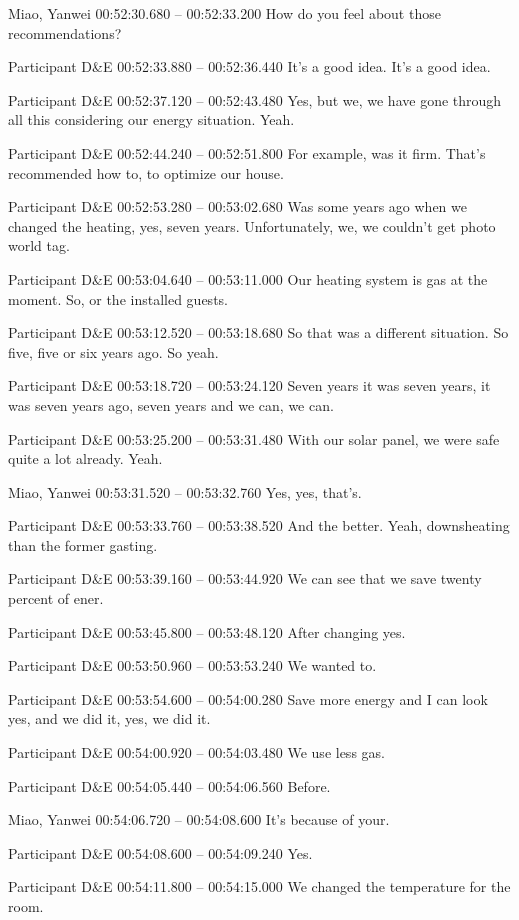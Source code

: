 {Miao, Yanwei 00:52:30.680 -- 00:52:33.200
How do you feel about those recommendations?

Participant D\&E 00:52:33.880 -- 00:52:36.440
It's a good idea. It's a good idea.

Participant D\&E 00:52:37.120 -- 00:52:43.480
Yes, but we, we have gone through all this considering our energy situation. Yeah.

Participant D\&E 00:52:44.240 -- 00:52:51.800
For example, was it firm. That's recommended how to, to optimize our house.

Participant D\&E 00:52:53.280 -- 00:53:02.680
Was some years ago when we changed the heating, yes, seven years. Unfortunately, we, we couldn't get photo world tag.

Participant D\&E 00:53:04.640 -- 00:53:11.000
Our heating system is gas at the moment. So, or the installed guests.

Participant D\&E 00:53:12.520 -- 00:53:18.680
So that was a different situation. So five, five or six years ago. So yeah.

Participant D\&E 00:53:18.720 -- 00:53:24.120
Seven years it was seven years, it was seven years ago, seven years and we can, we can.

Participant D\&E 00:53:25.200 -- 00:53:31.480
With our solar panel, we were safe quite a lot already. Yeah.

Miao, Yanwei 00:53:31.520 -- 00:53:32.760
Yes, yes, that's.

Participant D\&E 00:53:33.760 -- 00:53:38.520
And the better. Yeah, downsheating than the former gasting.

Participant D\&E 00:53:39.160 -- 00:53:44.920
We can see that we save twenty percent of ener.

Participant D\&E 00:53:45.800 -- 00:53:48.120
After changing yes.

Participant D\&E 00:53:50.960 -- 00:53:53.240
We wanted to.

Participant D\&E 00:53:54.600 -- 00:54:00.280
Save more energy and I can look yes, and we did it, yes, we did it.

Participant D\&E 00:54:00.920 -- 00:54:03.480
We use less gas.

Participant D\&E 00:54:05.440 -- 00:54:06.560
Before.

Miao, Yanwei 00:54:06.720 -- 00:54:08.600
It's because of your.

Participant D\&E 00:54:08.600 -- 00:54:09.240
Yes.

Participant D\&E 00:54:11.800 -- 00:54:15.000
We changed the temperature for the room.

}
